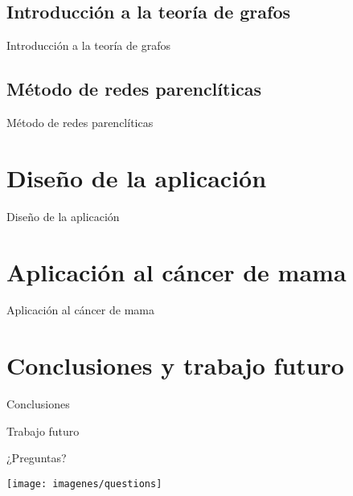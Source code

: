 \documentclass{beamer}
\begin{document}
\subsection{Introducción a la teoría de grafos}
\begin{frame}{Introducción a la teoría de grafos}
	
\end{frame}

\subsection{Método de redes parenclíticas}
\begin{frame}{Método de redes parenclíticas}
	
\end{frame}

\section{Diseño de la aplicación}
\begin{frame}{Diseño de la aplicación}
	
\end{frame}

\section{Aplicación al cáncer de mama}
\begin{frame}{Aplicación al cáncer de mama}
	
\end{frame}

\section{Conclusiones y trabajo futuro}
\begin{frame}{Conclusiones}
	
\end{frame}

\begin{frame}{Trabajo futuro}
	
\end{frame}

\begin{frame}{¿Preguntas?}
	
	{%
		\centering
		\texttt{[image: imagenes/questions]}
	}


\end{frame}
\end{document}
